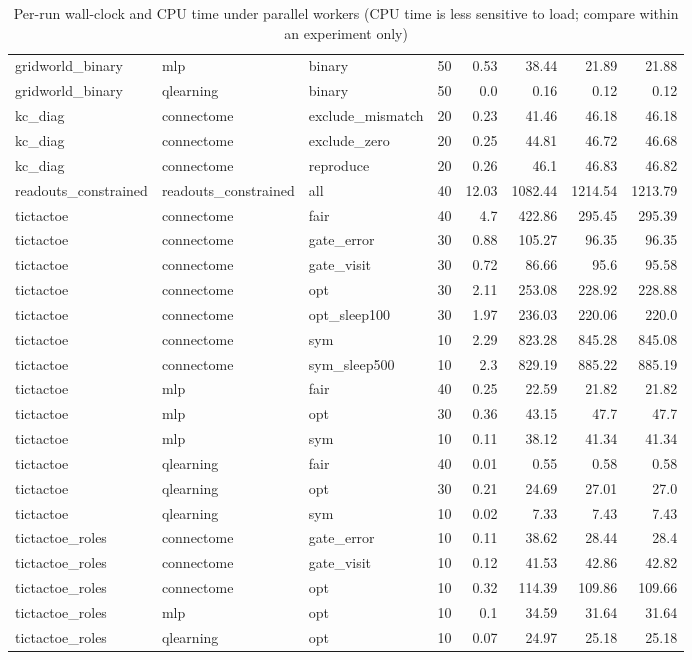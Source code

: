 \begin{table}[t]
\begin{tabular}{lllrrrrr}
gridworld\_binary & mlp & binary & 50 & 0.53 & 38.44 & 21.89 & 21.88 \\
gridworld\_binary & qlearning & binary & 50 & 0.0 & 0.16 & 0.12 & 0.12 \\
kc\_diag & connectome & exclude\_mismatch & 20 & 0.23 & 41.46 & 46.18 & 46.18 \\
kc\_diag & connectome & exclude\_zero & 20 & 0.25 & 44.81 & 46.72 & 46.68 \\
kc\_diag & connectome & reproduce & 20 & 0.26 & 46.1 & 46.83 & 46.82 \\
readouts\_constrained & readouts\_constrained & all & 40 & 12.03 & 1082.44 & 1214.54 & 1213.79 \\
tictactoe & connectome & fair & 40 & 4.7 & 422.86 & 295.45 & 295.39 \\
tictactoe & connectome & gate\_error & 30 & 0.88 & 105.27 & 96.35 & 96.35 \\
tictactoe & connectome & gate\_visit & 30 & 0.72 & 86.66 & 95.6 & 95.58 \\
tictactoe & connectome & opt & 30 & 2.11 & 253.08 & 228.92 & 228.88 \\
tictactoe & connectome & opt\_sleep100 & 30 & 1.97 & 236.03 & 220.06 & 220.0 \\
tictactoe & connectome & sym & 10 & 2.29 & 823.28 & 845.28 & 845.08 \\
tictactoe & connectome & sym\_sleep500 & 10 & 2.3 & 829.19 & 885.22 & 885.19 \\
tictactoe & mlp & fair & 40 & 0.25 & 22.59 & 21.82 & 21.82 \\
tictactoe & mlp & opt & 30 & 0.36 & 43.15 & 47.7 & 47.7 \\
tictactoe & mlp & sym & 10 & 0.11 & 38.12 & 41.34 & 41.34 \\
tictactoe & qlearning & fair & 40 & 0.01 & 0.55 & 0.58 & 0.58 \\
tictactoe & qlearning & opt & 30 & 0.21 & 24.69 & 27.01 & 27.0 \\
tictactoe & qlearning & sym & 10 & 0.02 & 7.33 & 7.43 & 7.43 \\
tictactoe\_roles & connectome & gate\_error & 10 & 0.11 & 38.62 & 28.44 & 28.4 \\
tictactoe\_roles & connectome & gate\_visit & 10 & 0.12 & 41.53 & 42.86 & 42.82 \\
tictactoe\_roles & connectome & opt & 10 & 0.32 & 114.39 & 109.86 & 109.66 \\
tictactoe\_roles & mlp & opt & 10 & 0.1 & 34.59 & 31.64 & 31.64 \\
tictactoe\_roles & qlearning & opt & 10 & 0.07 & 24.97 & 25.18 & 25.18 \\
\bottomrule
\end{tabular}
\caption{Per-run wall-clock and CPU time under parallel workers (CPU time is less sensitive to load; compare within an experiment only)}
\label{tab:compute_cost}
\end{table}